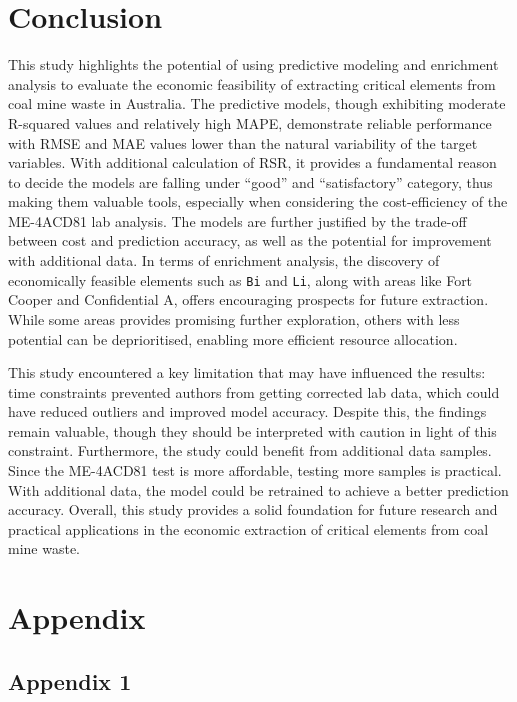 \documentclass[11pt,a4paper,]{article}
\begin{document}
\section{Conclusion}\label{conclusion}

This study highlights the potential of using predictive modeling and enrichment analysis to evaluate the economic feasibility of extracting critical elements from coal mine waste in Australia. The predictive models, though exhibiting moderate R-squared values and relatively high MAPE, demonstrate reliable performance with RMSE and MAE values lower than the natural variability of the target variables. With additional calculation of RSR, it provides a fundamental reason to decide the models are falling under ``good'' and ``satisfactory'' category, thus making them valuable tools, especially when considering the cost-efficiency of the ME-4ACD81 lab analysis. The models are further justified by the trade-off between cost and prediction accuracy, as well as the potential for improvement with additional data. In terms of enrichment analysis, the discovery of economically feasible elements such as \texttt{Bi} and \texttt{Li}, along with areas like Fort Cooper and Confidential A, offers encouraging prospects for future extraction. While some areas provides promising further exploration, others with less potential can be deprioritised, enabling more efficient resource allocation.

This study encountered a key limitation that may have influenced the results: time constraints prevented authors from getting corrected lab data, which could have reduced outliers and improved model accuracy. Despite this, the findings remain valuable, though they should be interpreted with caution in light of this constraint. Furthermore, the study could benefit from additional data samples. Since the ME-4ACD81 test is more affordable, testing more samples is practical. With additional data, the model could be retrained to achieve a better prediction accuracy. Overall, this study provides a solid foundation for future research and practical applications in the economic extraction of critical elements from coal mine waste.

\newpage

\section{Appendix}\label{appendix}

\subsection{Appendix 1}\label{sec-appendixone}
\end{document}
